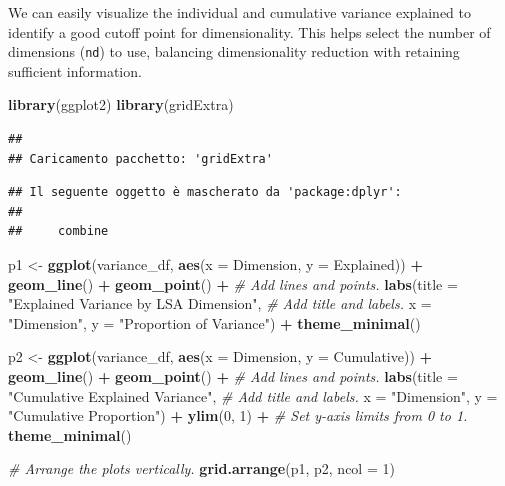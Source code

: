 \documentclass[
]{book}
\newenvironment{Shaded}{\begin{snugshade}}{\end{snugshade}}
\newcommand{\AttributeTok}[1]{\textcolor[rgb]{0.13,0.29,0.53}{#1}}
\newcommand{\CommentTok}[1]{\textcolor[rgb]{0.56,0.35,0.01}{\textit{#1}}}
\newcommand{\DecValTok}[1]{\textcolor[rgb]{0.00,0.00,0.81}{#1}}
\newcommand{\FunctionTok}[1]{\textcolor[rgb]{0.13,0.29,0.53}{\textbf{#1}}}
\newcommand{\NormalTok}[1]{#1}
\newcommand{\OtherTok}[1]{\textcolor[rgb]{0.56,0.35,0.01}{#1}}
\newcommand{\SpecialCharTok}[1]{\textcolor[rgb]{0.81,0.36,0.00}{\textbf{#1}}}
\newcommand{\StringTok}[1]{\textcolor[rgb]{0.31,0.60,0.02}{#1}}
\begin{document}
We can easily visualize the individual and cumulative variance explained to identify a good cutoff point for dimensionality. This helps select the number of dimensions (\texttt{nd}) to use, balancing dimensionality reduction with retaining sufficient information.

\begin{Shaded}
\begin{Highlighting}[]
\FunctionTok{library}\NormalTok{(ggplot2)}
\FunctionTok{library}\NormalTok{(gridExtra) }
\end{Highlighting}
\end{Shaded}

\begin{verbatim}
## 
## Caricamento pacchetto: 'gridExtra'
\end{verbatim}

\begin{verbatim}
## Il seguente oggetto è mascherato da 'package:dplyr':
## 
##     combine
\end{verbatim}

\begin{Shaded}
\begin{Highlighting}[]
\NormalTok{p1 }\OtherTok{\textless{}{-}} \FunctionTok{ggplot}\NormalTok{(variance\_df, }\FunctionTok{aes}\NormalTok{(}\AttributeTok{x =}\NormalTok{ Dimension, }\AttributeTok{y =}\NormalTok{ Explained)) }\SpecialCharTok{+}
  \FunctionTok{geom\_line}\NormalTok{() }\SpecialCharTok{+} \FunctionTok{geom\_point}\NormalTok{() }\SpecialCharTok{+} \CommentTok{\# Add lines and points.}
  \FunctionTok{labs}\NormalTok{(}\AttributeTok{title =} \StringTok{"Explained Variance by LSA Dimension"}\NormalTok{, }\CommentTok{\# Add title and labels.}
       \AttributeTok{x =} \StringTok{"Dimension"}\NormalTok{, }\AttributeTok{y =} \StringTok{"Proportion of Variance"}\NormalTok{) }\SpecialCharTok{+}
  \FunctionTok{theme\_minimal}\NormalTok{()}

\NormalTok{p2 }\OtherTok{\textless{}{-}} \FunctionTok{ggplot}\NormalTok{(variance\_df, }\FunctionTok{aes}\NormalTok{(}\AttributeTok{x =}\NormalTok{ Dimension, }\AttributeTok{y =}\NormalTok{ Cumulative)) }\SpecialCharTok{+}
  \FunctionTok{geom\_line}\NormalTok{() }\SpecialCharTok{+} \FunctionTok{geom\_point}\NormalTok{() }\SpecialCharTok{+} \CommentTok{\# Add lines and points.}
  \FunctionTok{labs}\NormalTok{(}\AttributeTok{title =} \StringTok{"Cumulative Explained Variance"}\NormalTok{, }\CommentTok{\# Add title and labels.}
       \AttributeTok{x =} \StringTok{"Dimension"}\NormalTok{, }\AttributeTok{y =} \StringTok{"Cumulative Proportion"}\NormalTok{) }\SpecialCharTok{+}
  \FunctionTok{ylim}\NormalTok{(}\DecValTok{0}\NormalTok{, }\DecValTok{1}\NormalTok{) }\SpecialCharTok{+} \CommentTok{\# Set y{-}axis limits from 0 to 1.}
  \FunctionTok{theme\_minimal}\NormalTok{() }

\CommentTok{\# Arrange the plots vertically.}
\FunctionTok{grid.arrange}\NormalTok{(p1, p2, }\AttributeTok{ncol =} \DecValTok{1}\NormalTok{)}
\end{Highlighting}
\end{Shaded}
\end{document}
